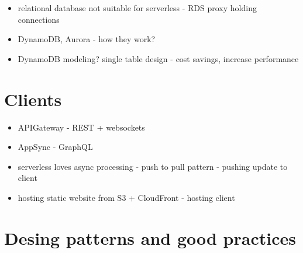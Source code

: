 \begin{itemize}
    \item relational database not suitable for serverless - RDS proxy holding connections
    \item DynamoDB, Aurora - how they work?
    \item DynamoDB modeling? single table design - cost savings, increase performance
\end{itemize}

\section{Clients}

\begin{itemize}
    \item APIGateway - REST + websockets
    \item AppSync - GraphQL
    \item serverless loves async processing - push to pull pattern - pushing update to client
    \item hosting static website from S3 + CloudFront - hosting client
\end{itemize}

\section{Desing patterns and good practices}